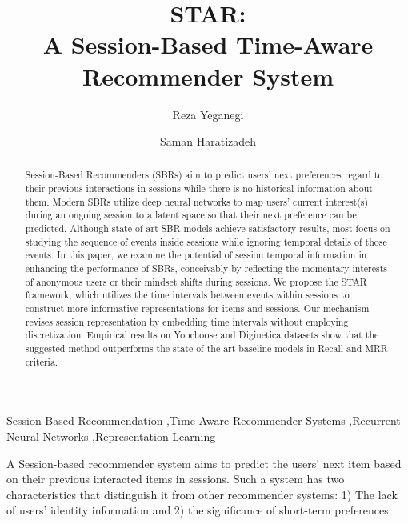 \documentclass[3p, preprint, times]{elsarticle}
\begin{document}
\begin{frontmatter}


\title{STAR: \\ A Session-Based Time-Aware Recommender System}


\author[label1]{Reza Yeganegi}

\author[label1]{Saman Haratizadeh}


\address[label1]{Faculty of New Sciences and Technologies, University of Tehran, Tehran, Iran}


\begin{abstract}

Session-Based Recommenders (SBRs) aim to predict users' next preferences regard to their previous interactions in sessions while there is no historical information about them. Modern SBRs utilize deep neural networks to map users' current interest(s) during an ongoing session to a  latent space so that their next preference can be predicted. Although state-of-art SBR models achieve satisfactory results, most focus on studying the sequence of events inside sessions while ignoring temporal details of those events. In this paper, we examine the potential of session temporal information in enhancing the performance of SBRs, conceivably by reflecting the momentary interests of anonymous users or their mindset shifts during sessions. We propose the STAR framework, which utilizes the time intervals between events within sessions to construct more informative representations for items and sessions. Our mechanism revises session representation by embedding time intervals without employing discretization. Empirical results on Yoochoose and Diginetica datasets show that the suggested method outperforms the state-of-the-art baseline models in Recall and MRR criteria.

\end{abstract}

\begin{keyword}
Session-Based Recommendation \sep Time-Aware Recommender Systems \sep Recurrent Neural Networks \sep Representation Learning
\end{keyword}

\end{frontmatter}

\label{sec:Introduction}

A Session-based recommender system aims to predict the users' next item based on their previous interacted items in sessions. Such a system has two characteristics that distinguish it from other recommender systems: 1) The lack of users' identity information and 2) the significance of short-term preferences \cite{wang2019survey}.
\end{document}
